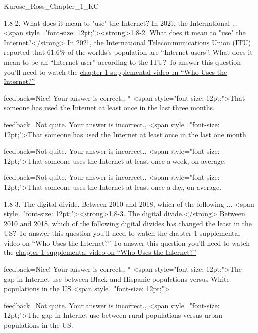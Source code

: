 \documentclass[a4paper]{article}
\begin{document}
\begin{quiz}{Kurose_Ross_Chapter_1_KC}
\begin{multi}[
	points=1,
	penalty=0.33333,
]{1.8-2. What does it mean to "use" the Internet? In 2021, the International ...}
<span style="font-size: 12pt;"><strong>1.8-2. What does it mean to "use" the Internet?</strong> In 2021, the International Telecommunications Union (ITU) reported that 61.6\% of the worlds’s population are “Internet users”.  What does it mean to be an “Internet user” according to the ITU? To answer this question you’ll need to watch the \href{https://www.youtube.com/watch?v=-YaGGf8C1A4}{chapter 1 supplemental video on “Who Uses  the Internet?”}
\item[feedback={Nice!  Your answer is correct.},]* <span style="font-size: 12pt;">That someone has used the Internet at least once in the last three months.
\item[feedback={Not quite.  Your answer is incorrect.},] <span style="font-size: 12pt;">That someone has used the Internet at least once in the last one month
\item[feedback={Not quite.  Your answer is incorrect.},] <span style="font-size: 12pt;">That someone uses the Internet at least once a week, on average.
\item[feedback={Not quite.  Your answer is incorrect.},] <span style="font-size: 12pt;">That someone uses the Internet at least once a day, on average.
\end{multi}

\begin{multi}[
	points=1,
	penalty=0.33333,
]{1.8-3.  The digital divide. Between 2010 and 2018, which of the following ...}
<span style="font-size: 12pt;"><strong>1.8-3.  The digital divide.</strong> Between 2010 and 2018, which of the following digital divides has changed the least in the US? To answer this question you’ll need to watch the chapter 1 supplemental video on “Who Uses  the Internet?” To answer this question you’ll need to watch the \href{https://www.youtube.com/watch?v=-YaGGf8C1A4}{chapter 1 supplemental video on “Who Uses  the Internet?”}
\item[feedback={Nice!  Your answer is correct.},]* <span style="font-size: 12pt;">The gap in Internet use between Black and Hispanic populations versus White populations in the US.<span style="font-size: 12pt;">
\item[feedback={Not quite.  Your answer is incorrect.},] <span style="font-size: 12pt;">The gap in Internet use between rural populations versus urban populations in the US.
\end{multi}


\end{quiz}
\end{document}
